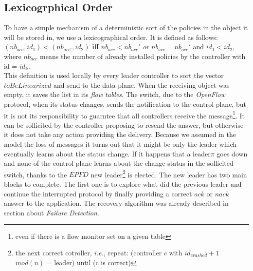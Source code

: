 \documentclass{article}
\begin{document}
\subsection{Lexicogrphical Order}
To have a simple mechanism of a deterministic sort of the policies in the object it will be stored in, we use a lexicographical order.
It is defined as follows:\\
$(nb_{acc}, id_1 )<(nb_{acc'}, id_2)$  \textbf{iff}  $nb_{acc} < nb_{acc}'  $ \emph{or} $nb_{acc} = nb_{acc}'$ and $id_1<id_2$, where $nb_{acc}$ means the number of already installed policies by the controller with id = $id_k$.\\
This definition is used locally by every leader controller to sort the vector $toBeLinearized$ and send to the data plane. When the receiving object was empty, it saves the list in its \emph{flow tables}. The switch, due to the \emph{OpenFlow} protocol, when its status changes, sends the notification to the control plane, but it is not its responsibility to guarntee that all controllers receive the message\footnote{even if there is a flow monitor set on a given table}. It can be sollicited by the controller proposing to resend the answer, but otherwise it does not take any action providing the delivery. Because we assumed in the model the loss of messages it turns out that it might be only the leader which eventually learns about the status change.
If it happens that a leader$\pi$ goes down and none of the control plane learns about the change status in the sollicited switch, thanks to the $EPFD$ new leader\footnote{the next correct cotroller, \emph{i.e.,} repeat: (controller $c$ with $id_{crashed}+1$ $mod(n)$ = leader) until (c is correct) } is elected.
The new leader has two main blocks to complete. The first one is to explore what did the previous leader and continue the interrupted protocol by finally providing a correct $ack$ or $nack$ answer to the application. The recovery algorithm was already described in section about \emph{Failure Detection}. \\
 
\end{document}
